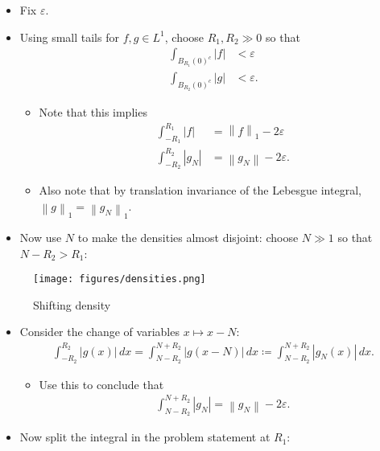 \begin{solution}

\envlist

\begin{itemize}
\item
  Fix \({\varepsilon}\).
\item
  Using small tails for \(f, g \in L^1\), choose \(R_1, R_2 \gg 0\) so
  that
  \begin{align*}
  \int_{B_{R_1}(0)^c} {\left\lvert {f} \right\rvert} &< {\varepsilon}\\
  \int_{B_{R_2}(0)^c} {\left\lvert {g} \right\rvert} &< {\varepsilon}
  .\end{align*}

  \begin{itemize}
  \item
    Note that this implies
    \begin{align*}
    \int_{-R_1}^{R_1} {\left\lvert {f} \right\rvert} &= {\left\lVert {f} \right\rVert}_1 - 2{\varepsilon}\\
    \int_{-R_2}^{R_2} {\left\lvert {g_N} \right\rvert} &= {\left\lVert {g_N} \right\rVert} - 2{\varepsilon}
    .\end{align*}
  \item
    Also note that by translation invariance of the Lebesgue integral,
    \({\left\lVert {g} \right\rVert}_1 = {\left\lVert {g_N} \right\rVert}_1\).
  \end{itemize}
\item
  Now use \(N\) to make the densities almost disjoint: choose \(N\gg 1\)
  so that \(N-R_2 > R_1\):
\end{itemize}

\begin{figure}
\centering
\texttt{[image: figures/densities.png]}
\caption{Shifting density}
\end{figure}

\begin{itemize}
\tightlist
\item
  Consider the change of variables \(x\mapsto x-N\):
  \begin{align*}
  \int_{-R_2}^{R_2} {\left\lvert {g(x)} \right\rvert}\,dx
  = \int_{N-R_2} ^{N+R_2} {\left\lvert {g(x-N)} \right\rvert} \,dx
  \coloneqq\int_{N-R_2} ^{N+R_2} {\left\lvert {g_N(x)} \right\rvert} \,dx
  .\end{align*}

  \begin{itemize}
  \tightlist
  \item
    Use this to conclude that
    \begin{align*}
    \int_{N-R_2}^{N+R_2} {\left\lvert {g_N} \right\rvert} = {\left\lVert {g_N} \right\rVert} - 2{\varepsilon}
    .\end{align*}
  \end{itemize}
\item
  Now split the integral in the problem statement at \(R_1\):
\end{itemize}


\end{solution}
